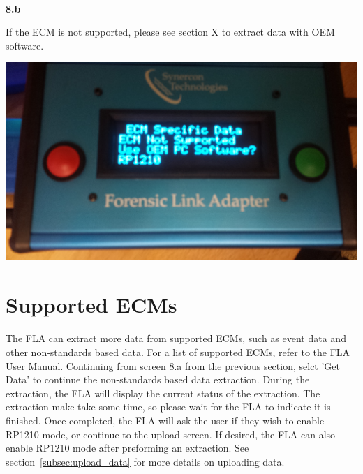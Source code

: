 \documentclass[11pt, oneside]{book}
\begin{document}
\\[\baselineskip]
\noindent\begin{minipage}{0.45\textwidth}%
\begin{center}
\textbf{8.b}\\[\baselineskip]
\end{center}
If the ECM is not supported, please see section X to extract data with OEM software.
\end{minipage}%
\hfill%
\begin{minipage}{0.45\textwidth}
\includegraphics[width=\linewidth]{../media/fla_screens/ecm_not_supported}
\end{minipage}

\section{Supported ECMs}
\paragraph{  }
The FLA can extract more data from supported ECMs, such as event data and other non-standards based data. For a list of supported ECMs, refer to the FLA User Manual. Continuing from screen 8.a from the previous section, selct 'Get Data' to continue the non-standards based data extraction. During the extraction, the FLA will display the current status of the extraction. The extraction make take some time, so please wait for the FLA to indicate it is finished. Once completed, the FLA will ask the user if they wish to enable RP1210 mode, or continue to the upload screen. If desired, the FLA can also enable RP1210 mode after preforming an extraction. See section~\ref{subsec:upload_data} for more details on uploading data.
\end{document}
